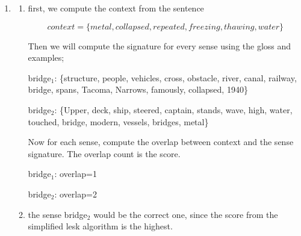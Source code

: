 \documentclass[11pt]{article}
\begin{document}
\begin{enumerate}
\begin{enumerate}
\[
tf-idf=1\cdot\log\left(\frac{24}{10}\right)=0.3802...\approx0.38
\]

For term Museumplein:

\[
idf_t=\log\left(\frac{24}{3}\right)
\]

\[
tf-idf=1\cdot\log\left(\frac{24}{3}\right)=0.9030...\approx0.90
\]

\item

Museumplein has a higher tf-idf value, this is due to the document frequency; museumplein occurs in less documents, so it gets weighted more.

\end{enumerate}

\item

\begin{enumerate}

\item

first, we compute the context from the sentence

\[
context=\{metal, collapsed, repeated, freezing, thawing, water\}
\]

Then we will compute the signature for every sense using the gloss and examples;

bridge$_1$: \{structure, people, vehicles, cross, obstacle, river, canal, railway, bridge, spans, Tacoma, Narrows, famously, collapsed, 1940\}

bridge$_2$: \{Upper, deck, ship, steered, captain, stands, wave, high, water, touched, bridge, modern, vessels, bridges, metal\}

Now for each sense, compute the overlap between context and the sense signature. The overlap count is the score.

bridge$_1$: overlap=1

bridge$_2$: overlap=2

\item

the sense bridge$_2$ would be the correct one, since the score from the simplified lesk algorithm is the highest.

\end{enumerate}

\end{enumerate}
\end{document}
